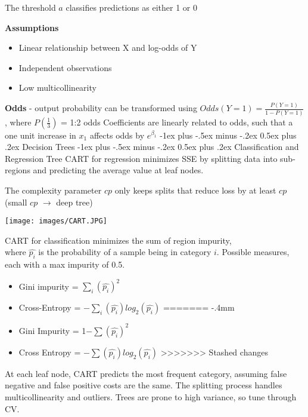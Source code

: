 \documentclass[10pt,landscape]{article}
\makeatletter
\renewcommand{\section}{\@startsection{section}{1}{0mm}%
                                {-1ex plus -.5ex minus -.2ex}%
                                {0.5ex plus .2ex}%
                                {\normalfont\large\bfseries}}
\renewcommand{\subsection}{\@startsection{subsection}{2}{0mm}%
                                {-1ex plus -.5ex minus -.2ex}%
                                {0.5ex plus .2ex}%
                                {\normalfont\normalsize\bfseries}}
\makeatother
\begin{document}
\begin{multicols}{3}
\begin{center}
\end{center}
\vspace{-2mm}
The threshold $a$ classifies predictions as either 1 or 0

\textbf{Assumptions}
\begin{itemize}[label={--},leftmargin=4mm]
\vspace{-1mm}
\itemsep -.4mm
\item Linear relationship between X and log-odds of Y
\item Independent observations
\item Low multicollinearity
\end{itemize}
\textbf{Odds} - output probability can be transformed using $Odds(Y = 1) = \frac{P(Y=1)}{1-P(Y=1)}$, where $P(\frac{1}{3})$ = 1:2 odds
Coefficients are linearly related to odds, such that a one unit increase in $x_1$ affects odds by $e^{\beta_1}$
\vspace{-.5mm}
\section{Decision Trees}
\subsection{Classification and Regression Tree}
CART for regression minimizes SSE by splitting data into sub-regions and predicting the average value at leaf nodes.

The complexity parameter $cp$ only keeps splits that reduce loss by at least $cp$ (small $cp$ $\to$ deep tree)
\smallskip
\begin{center}
\vspace{-1mm}
    \texttt{[image: images/CART.JPG]}
\end{center}
\vspace{-2mm}
CART for classification minimizes the sum of region impurity, \\
where $\hat{p_i}$ is the probability of a sample being in category $i$.
Possible measures, each with a max impurity of 0.5.
\begin{itemize}[label={--},leftmargin=4mm]
\vspace{-1mm}
<<<<<<< Updated upstream
\itemsep -.4mm 
\item Gini impurity = $\sum_i (\hat{p_i})^2$ 
\item Cross-Entropy = $-\sum_i (\hat{p_i}) log_2(\hat{p_i})$ 
=======
\itemsep -.4mm
\item Gini Impurity = 1$ - \sum (\hat{p_i})^2$
\item Cross Entropy = $-\sum (\hat{p_i}) log_2(\hat{p_i})$
>>>>>>> Stashed changes
\end{itemize}
At each leaf node, CART predicts the most frequent category, assuming false negative and false positive costs are the same. The splitting process handles multicollinearity and outliers. Trees are prone to high variance, so tune through CV.


\end{multicols}
\end{document}
